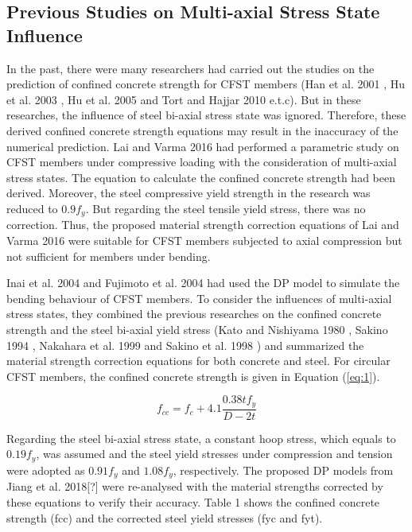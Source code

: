 \documentclass[12pt,a4]{article}
\begin{document}
	\subsection{Previous Studies on Multi-axial Stress State Influence}
	In the past, there were many researchers had carried out the studies on the prediction of confined concrete strength for CFST members (Han et al. 2001 \cite{RN23}, Hu et al. 2003 \cite{RN1}, Hu et al. 2005 \cite{RN29} and Tort and Hajjar 2010 \cite{RN46} e.t.c). But in these researches, the influence of steel bi-axial stress state was ignored. Therefore, these derived confined concrete strength equations may result in the inaccuracy of the numerical prediction. Lai and Varma 2016 \cite{RN32} had performed a parametric study on CFST members under compressive loading with the consideration of multi-axial stress states. The equation to calculate the confined concrete strength had been derived. Moreover, the steel compressive yield strength in the research was reduced to $0.9f_y$. But regarding the steel tensile yield stress, there was no correction. Thus, the proposed material strength correction equations of Lai and Varma 2016 \cite{RN32} were suitable for CFST members subjected to axial compression but not sufficient for members under bending.
	\par
	Inai et al. 2004 \cite{RN30} and Fujimoto et al. 2004 \cite{RN15} had used the DP model to simulate the bending behaviour of CFST members. To consider the influences of multi-axial stress states, they combined the previous researches on the confined concrete strength and the steel bi-axial yield stress (Kato and Nishiyama 1980 \cite{RN139}, Sakino 1994 \cite{RN138}, Nakahara et al. 1999 \cite{RN137} and Sakino et al. 1998 \cite{RN135}) and summarized the material strength correction equations for both concrete and steel. For circular CFST members, the confined concrete strength is given in Equation (\ref{eq:1}).
	\par
	\begin{equation}
	f_{cc} = f_c + 4.1 \frac{0.38tf_y}{D-2t}
	\label{eq:1}
	\end{equation}
	\par
	Regarding the steel bi-axial stress state, a constant hoop stress, which equals to $0.19f_y$, was assumed and the steel yield stresses under compression and tension were adopted as $0.91f_y$ and $1.08f_y$, respectively. The proposed DP models from Jiang et al. 2018[?] were re-analysed with the material strengths corrected by these equations to verify their accuracy. Table 1 shows the confined concrete strength (fcc) and the corrected steel yield stresses (fyc and fyt).
	
	
	
	
	
	
	
	
	
\end{document}
